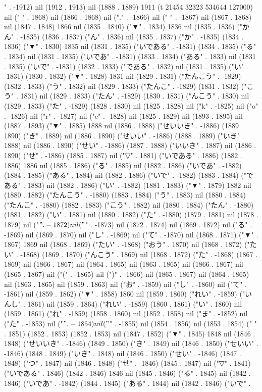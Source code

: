 " . -1912) nil (1912 . 1913) nil (1888 . 1889) 1911 (t 21454 32323 534644 127000) nil ("
" . 1868) nil (1866 . 1868) nil ("." . -1866) nil ("
" . -1867) nil (1867 . 1868) nil (1847 . 1848) 1866 nil (1835 . 1840) ("▼" . 1834) 1836 nil (1835 . 1836) ("かん" . -1835) (1836 . 1837) ("ん" . 1836) nil (1835 . 1837) ("か" . -1835) (1834 . 1836) ("▼" . 1830) 1835 nil (1831 . 1835) ("いである" . -1831) (1834 . 1835) ("る" . 1834) nil (1831 . 1835) ("いであ" . -1831) (1833 . 1834) ("ある" . 1833) nil (1831 . 1835) ("いで" . -1831) (1832 . 1833) ("である" . 1832) nil (1831 . 1835) ("い" . -1831) (1830 . 1832) ("▼" . 1828) 1831 nil (1829 . 1831) ("たんこう" . -1829) (1832 . 1833) ("う" . 1832) nil (1829 . 1833) ("たんこ" . -1829) (1831 . 1832) ("こう" . 1831) nil (1829 . 1833) ("たん" . -1829) (1830 . 1831) ("んこう" . 1830) nil (1829 . 1833) ("た" . -1829) (1828 . 1830) nil (1825 . 1828) nil ("k" . -1825) nil ("o" . -1826) nil ("r" . -1827) nil ("e" . -1828) nil (1825 . 1829) nil (1893 . 1895) nil (1887 . 1893) ("▼" . 1885) 1888 nil (1886 . 1888) ("せいいき" . -1886) (1889 . 1890) ("き" . 1889) nil (1886 . 1890) ("せいい" . -1886) (1888 . 1889) ("いき" . 1888) nil (1886 . 1890) ("せい" . -1886) (1887 . 1888) ("いいき" . 1887) nil (1886 . 1890) ("せ" . -1886) (1885 . 1887) nil ("▽" . 1881) ("いである" . 1886) (1882 . 1886) 1886 nil (1885 . 1886) ("る" . 1885) nil (1882 . 1886) ("いであ" . -1882) (1884 . 1885) ("ある" . 1884) nil (1882 . 1886) ("いで" . -1882) (1883 . 1884) ("である" . 1883) nil (1882 . 1886) ("い" . -1882) (1881 . 1883) ("▼" . 1879) 1882 nil (1880 . 1882) ("たんこう" . -1880) (1883 . 1884) ("う" . 1883) nil (1880 . 1884) ("たんこ" . -1880) (1882 . 1883) ("こう" . 1882) nil (1880 . 1884) ("たん" . -1880) (1881 . 1882) ("い" . 1881) nil (1880 . 1882) ("た" . -1880) (1879 . 1881) nil (1878 . 1879) nil ("$" . -1872) nil ("$" . -1873) nil (1872 . 1874) nil (1869 . 1872) nil ("る" . -1869) nil (1869 . 1870) nil ("し" . -1869) nil ("て" . -1870) nil (1868 . 1871) ("▼" . 1867) 1869 nil (1868 . 1869) ("たい" . -1868) ("おう" . 1870) nil (1868 . 1872) ("たい" . -1868) (1869 . 1870) ("んこう" . 1869) nil (1868 . 1872) ("た" . -1868) (1867 . 1869) nil (1866 . 1867) nil (1864 . 1865) nil (1863 . 1865) nil (1866 . 1867) nil (1865 . 1867) nil ("(" . -1865) nil (")" . -1866) nil (1865 . 1867) nil (1864 . 1865) nil (1863 . 1865) nil (1859 . 1863) nil ("お" . -1859) nil ("し" . -1860) nil ("て" . -1861) nil (1859 . 1862) ("▼" . 1858) 1860 nil (1859 . 1860) ("れい" . -1859) ("いんし" . 1861) nil (1859 . 1864) ("れい" . -1859) (1860 . 1861) ("い" . 1860) nil (1859 . 1861) ("れ" . -1859) (1858 . 1860) nil (1852 . 1858) nil ("ま" . -1852) nil ("た" . -1853) nil ("$" . -1854) nil ("$" . -1855) nil (1854 . 1856) nil (1853 . 1854) (" " . 1851) (1852 . 1853) (1852 . 1853) nil (1847 . 1852) ("▼" . 1845) 1848 nil (1846 . 1848) ("せいいき" . -1846) (1849 . 1850) ("き" . 1849) nil (1846 . 1850) ("せいい" . -1846) (1848 . 1849) ("いき" . 1848) nil (1846 . 1850) ("せい" . -1846) (1847 . 1848) ("つ" . 1847) nil (1846 . 1848) ("せ" . -1846) (1845 . 1847) nil ("▽" . 1841) ("いである" . 1846) (1842 . 1846) 1846 nil (1845 . 1846) ("る" . 1845) nil (1842 . 1846) ("いであ" . -1842) (1844 . 1845) ("ある" . 1844) nil (1842 . 1846) ("いで" . 